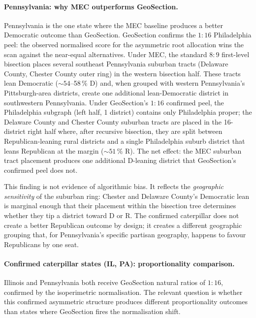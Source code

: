 \paragraph{Pennsylvania: why MEC outperforms GeoSection.}
Pennsylvania is the one state where the MEC baseline produces a better Democratic
outcome than GeoSection.
GeoSection confirms the $1:16$ Philadelphia peel: the observed normalised
score for the asymmetric root allocation wins the scan against the near-equal
alternatives.
Under MEC, the standard $8:9$ first-level bisection places several southeast
Pennsylvania suburban tracts (Delaware County, Chester County outer ring) in
the western bisection half.
These tracts lean Democratic ($\sim 54$--58\,\% D) and, when grouped with
western Pennsylvania's Pittsburgh-area districts, create one additional
lean-Democratic district in southwestern Pennsylvania.
Under GeoSection's $1:16$ confirmed peel, the Philadelphia subgraph (left half,
1 district) contains only Philadelphia proper; the Delaware County and Chester
County suburban tracts are placed in the 16-district right half where, after
recursive bisection, they are split between Republican-leaning rural districts
and a single Philadelphia suburb district that leans Republican at the margin
($\sim 51$\,\% R).
The net effect: the MEC suburban tract placement produces one additional
D-leaning district that GeoSection's confirmed peel does not.

This finding is not evidence of algorithmic bias.
It reflects the \emph{geographic sensitivity} of the suburban ring:
Chester and Delaware County's Democratic lean is marginal enough that
their placement within the bisection tree determines whether they tip
a district toward D or R.
The confirmed caterpillar does not create a better Republican outcome by design;
it creates a different geographic grouping that, for Pennsylvania's specific
partisan geography, happens to favour Republicans by one seat.

\paragraph{Confirmed caterpillar states (IL, PA): proportionality comparison.}
Illinois and Pennsylvania both receive GeoSection natural ratios of $1:16$,
confirmed by the isoperimetric normalisation.
The relevant question is whether this confirmed asymmetric structure produces
different proportionality outcomes than states where GeoSection fires the
normalisation shift.

